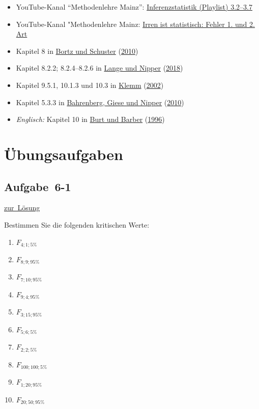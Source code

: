 \documentclass[
  11pt,
  ngerman,
  a4paper,
]{report}
\providecommand{\tightlist}{%
  \setlength{\itemsep}{0pt}\setlength{\parskip}{0pt}}
\begin{document}
\begin{itemize}
\tightlist
\item
  YouTube-Kanal \enquote{Methodenlehre Mainz}: \href{https://www.youtube.com/watch?v=pCCvA28l9es\&index=17\&list=PLSFgFMMLqanK_DUMJycmua0ODSaKq28Gb}{Inferenzstatistik (Playlist) 3.2--3.7}
\item
  YouTube-Kanal "Methodenlehre Mainz: \href{https://www.youtube.com/watch?v=q1jkbDMwflg}{Irren ist statistisch: Fehler 1. und 2. Art}
\item
  Kapitel 8 in \protect\hyperlink{ref-bortz}{Bortz und Schuster} (\protect\hyperlink{ref-bortz}{2010})
\item
  Kapitel 8.2.2; 8.2.4--8.2.6 in \protect\hyperlink{ref-delange}{Lange und Nipper} (\protect\hyperlink{ref-delange}{2018})
\item
  Kapitel 9.5.1, 10.1.3 und 10.3 in \protect\hyperlink{ref-klemm}{Klemm} (\protect\hyperlink{ref-klemm}{2002})
\item
  Kapitel 5.3.3 in \protect\hyperlink{ref-bahrenberg}{Bahrenberg, Giese und Nipper} (\protect\hyperlink{ref-bahrenberg}{2010})
\item
  \emph{Englisch:} Kapitel 10 in \protect\hyperlink{ref-burt}{Burt und Barber} (\protect\hyperlink{ref-burt}{1996})
\end{itemize}

\hypertarget{uxfcbungsaufgaben-5}{%
\section*{Übungsaufgaben}\label{uxfcbungsaufgaben-5}}

\nopagebreak

\hypertarget{aufgabe-6-1}{%
\subsection{Aufgabe~6-1}\label{aufgabe-6-1}}

\protect\hyperlink{loesung-6-1}{zur~Lösung}

Bestimmen Sie die folgenden kritischen Werte:

\begin{enumerate}
\def\labelenumi{\alph{enumi})}
\tightlist
\item
  \(F_{4;1;5\%}\)
\item
  \(F_{8;9;95\%}\)
\item
  \(F_{7;10;95\%}\)
\item
  \(F_{9;4;95\%}\)
\item
  \(F_{3;15;95\%}\)
\item
  \(F_{5;6;5\%}\)
\item
  \(F_{2;2;5\%}\)
\item
  \(F_{100;100;5\%}\)
\item
  \(F_{1;20;95\%}\)
\item
  \(F_{20;50;95\%}\)
\end{enumerate}
\end{document}
